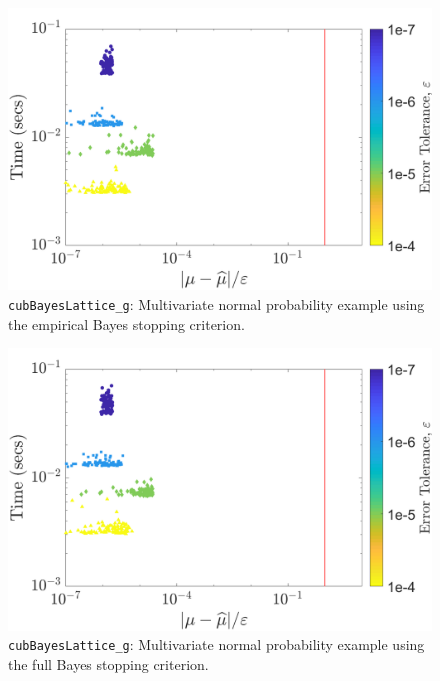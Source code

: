 \documentclass{iitthesis}          %
\newcommand{\code}[1]{\texttt{#1}}
\begin{document}
\begin{figure}
	\centering
	\includegraphics[width=0.95\linewidth]{"MVN_guaranteed_time_MLE_C2sin_d2_r2_2018-Sep-6"}
	\caption[MVN Guaranteed: MLE]{\code{cubBayesLattice\_g}: Multivariate normal probability example using the empirical Bayes stopping criterion.}
	\label{fig:mvn-guaranteed-MLE}
\end{figure}
\begin{figure}
	\centering
	\includegraphics[width=0.95\linewidth]{"MVN_guaranteed_time_full_C2sin_d2_r2_2018-Sep-6"}
	\caption[MVN guaranteed: FB]{\code{cubBayesLattice\_g}: Multivariate normal probability example using the full Bayes stopping criterion.}
	\label{fig:mvn-guaranteed-FB}
\end{figure}
\end{document}
